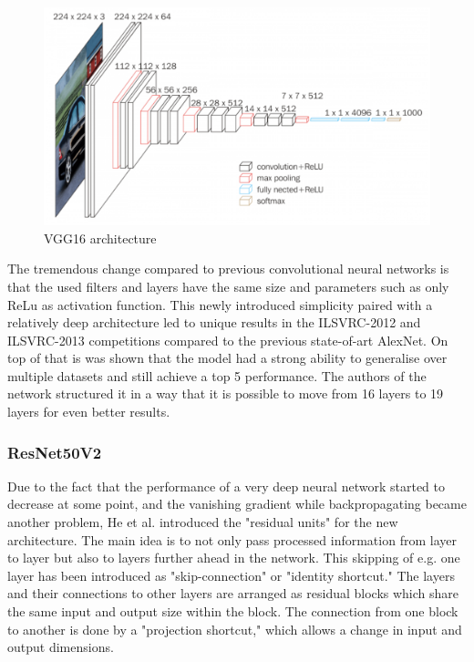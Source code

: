 \begin{figure}[ht]
  \centering
  \includegraphics[width=\linewidth]{figures/vgg16.png}
  \caption{VGG16 architecture}
  \label{fig:vgg16}
\end{figure}

The tremendous change compared to previous convolutional neural networks is that the used filters and layers have the same size and parameters such as only ReLu as activation function\cite{simonyan2015deep}. This newly introduced simplicity paired with a relatively deep architecture led to unique results in the ILSVRC-2012 and ILSVRC-2013 competitions compared to the previous state-of-art AlexNet. On top of that is was shown that the model had a strong ability to generalise over multiple datasets and still achieve a top 5 performance. The authors of the network structured it in a way that it is possible to move from 16 layers to 19 layers for even better results.

\subsubsection{ResNet50V2}\label{resnet}
Due to the fact that the performance of a very deep neural network started to decrease at some point, and the vanishing gradient while backpropagating became another problem, He et al. introduced the "residual units" for the new architecture\cite{he2015deep}. The main idea is to not only pass processed information from layer to layer but also to layers further ahead in the network. This skipping of e.g. one layer has been introduced as "skip-connection" or "identity shortcut." The layers and their connections to other layers are arranged as residual blocks which share the same input and output size within the block\cite{he2015deep}. The connection from one block to another is done by a "projection shortcut," which allows a change in input and output dimensions.

